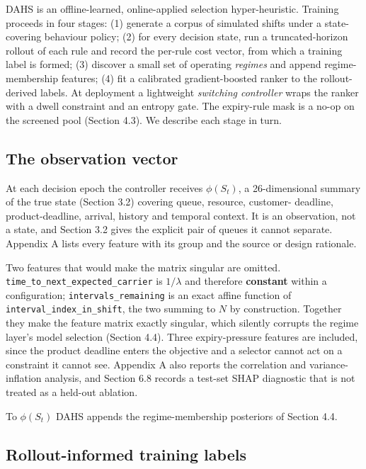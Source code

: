 \documentclass[review,3p,times]{elsarticle}
\theoremstyle{definition}
\begin{document}
DAHS is an offline-learned, online-applied selection hyper-heuristic.
Training proceeds in four stages: (1) generate a corpus of simulated
shifts under a state-covering behaviour policy; (2) for every decision
state, run a truncated-horizon rollout of each rule and record the
per-rule cost vector, from which a training label is formed; (3)
discover a small set of operating \emph{regimes} and append
regime-membership features; (4) fit a calibrated gradient-boosted ranker
to the rollout-derived labels. At deployment a lightweight
\emph{switching controller} wraps the ranker with a dwell constraint and
an entropy gate. The expiry-rule mask is a no-op on the screened pool
(Section 4.3). We describe each stage in turn.

\subsection{The observation vector}\label{the-observation-vector}

At each decision epoch the controller receives \(\phi(S_t)\), a
26-dimensional summary of the true state (Section 3.2) covering queue,
resource, customer- deadline, product-deadline, arrival, history and
temporal context. It is an observation, not a state, and Section 3.2
gives the explicit pair of queues it cannot separate. Appendix A lists
every feature with its group and the source or design rationale.

Two features that would make the matrix singular are omitted.
\texttt{time\_to\_next\_expected\_carrier} is \(1/\lambda\) and
therefore \textbf{constant} within a configuration;
\texttt{intervals\_remaining} is an exact affine function of
\texttt{interval\_index\_in\_shift}, the two summing to \(N\) by
construction. Together they make the feature matrix exactly singular,
which silently corrupts the regime layer's model selection (Section
4.4). Three expiry-pressure features are included, since the product
deadline enters the objective and a selector cannot act on a constraint
it cannot see. Appendix A also reports the correlation and
variance-inflation analysis, and Section 6.8 records a test-set SHAP
diagnostic that is not treated as a held-out ablation.

To \(\phi(S_t)\) DAHS appends the regime-membership posteriors of
Section 4.4.

\subsection{Rollout-informed training
labels}\label{rollout-informed-training-labels}
\end{document}
